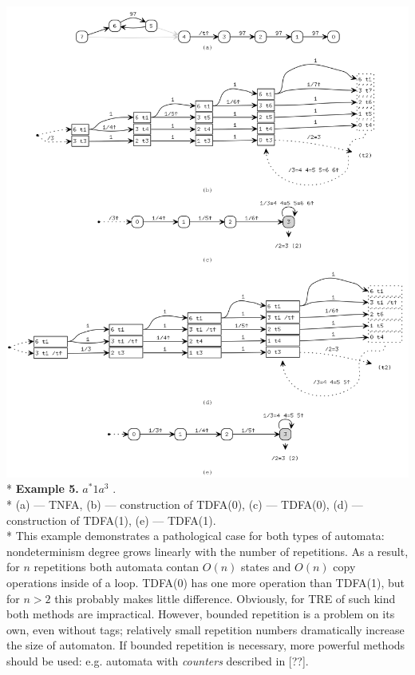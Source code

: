 \documentclass{article}
\theoremstyle{definition}
\begin{document}
\begin{center}
\includegraphics[width=0.9\linewidth]{img/example3/all.png}\\*
\textbf{Example 5.} $a^* 1 a^{3}$ .\\*\medskip
\small{
(a) --- TNFA, (b) --- construction of TDFA(0), (c) --- TDFA(0), (d) --- construction of TDFA(1), (e) --- TDFA(1).\\*\medskip
This example demonstrates a pathological case for both types of automata:
nondeterminism degree grows linearly with the number of repetitions.
As a result, for $n$ repetitions both automata contan $O(n)$ states and $O(n)$ copy operations inside of a loop.
TDFA(0) has one more operation than TDFA(1), but for $n \!>\! 2$ this probably makes little difference.
Obviously, for TRE of such kind both methods are impractical.
However, bounded repetition is a problem on its own, even without tags;
relatively small repetition numbers dramatically increase the size of automaton.
If bounded repetition is necessary, more powerful methods should be used:
e.g. automata with \emph{counters} described in [??].
}\\[1em]


\end{center}
\end{document}
